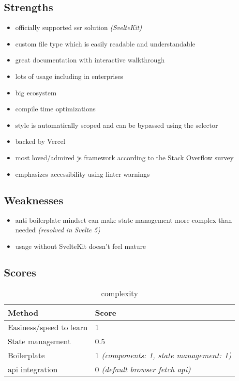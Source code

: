 \subsection{Strengths}
\label{subsec:svelte:strengths}
\begin{itemize}
    \item officially supported \acrshort{ssr} solution \textit{(SvelteKit)}
    \item custom file type which is easily readable and understandable
    \item great documentation with interactive walkthrough
    \item lots of usage including in enterprises
    \item big ecosystem
    \item compile time optimizations
    \item style is automatically scoped and can be bypassed using the  selector
    \item backed by Vercel
    \item most loved/admired \acrshort{js} \gls{framework} according to the Stack Overflow survey \cite{stackoverflow:survey_2023}
    \item emphasizes accessibility using linter warnings
\end{itemize}

\subsection{Weaknesses}
\label{subsec:svelte:weaknesses}
\begin{itemize}
    \item anti boilerplate mindset can make state management more complex than needed \textit{(resolved in Svelte 5)}
    \item usage without SvelteKit doesn't feel mature
\end{itemize}

\subsection{Scores}
\label{subsec:svelte:scores}

\begin{table}[H]
    \centering
    \begin{tabular}{|l|l|}
        \hline
        \textbf{Method}            & \textbf{Score}                                    \\
        \hline
        Easiness/speed to learn    & 1                                                 \\ \hline
        State management           & 0.5                                               \\ \hline
        Boilerplate                & 1 \textit{(components: 1, state management: 1)}   \\ \hline
        \acrshort{api} integration & 0 \textit{(default browser fetch \acrshort{api})} \\ \hline
    \end{tabular}
    \caption{complexity}
    \label{tab:svelte:complexity}
\end{table}

